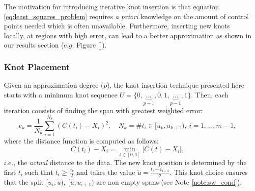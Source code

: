The motivation for introducing iterative knot insertion is that equation \eqref{eq:least_squares_problem} 
requires \emph{a priori} knowledge on the amount of control points needed which is often unavailable. Furthermore, inserting new 
knots locally, at regions with high error, can  lead to a better approximation as shown in our results 
section ($e.g.$ Figure \ref{}). 
\subsubsection{Knot Placement}\label{sec:knot_placment}
Given an approximation degree ($p$), 
the knot insertion technique presented here starts with a minimum knot sequence
$U=\{0,\underbrace{\ldots}_{p-1},0,1,\underbrace{\ldots}_{p-1},1\}$.
%
Then, each iteration consists of finding the span with greatest weighted error: 
 $$e_k = \frac{1}{N_k}\sum_{i=1}^{N_k} (C(t_i) - X_i)^2,\quad N_k = \# t_i\in [u_k, u_{k+1}),\ i=1,\ldots,m-1, $$
 where the distance function is computed as follows:
 \begin{equation}\label{eq:distance_projection}
  C(t_i) - X_i = \min_{t\in[0,1]} |C(t) -  X_i|,
 \end{equation}
$i.e.$, the \emph{actual} distance to the data. The new knot position is determined by
 the first $t_i$ such that $t_i \geq \frac{e_k}{2}$ and takes
 the value $\tilde u = \frac{t_i+t_{i+1}}{2}$. 
 This knot choice ensures that the split $[u_i, \tilde u),\ [\tilde u,u_{i+1})$ are non empty spans 
 (see Note \ref{note:sw_cond}). 

 
 
